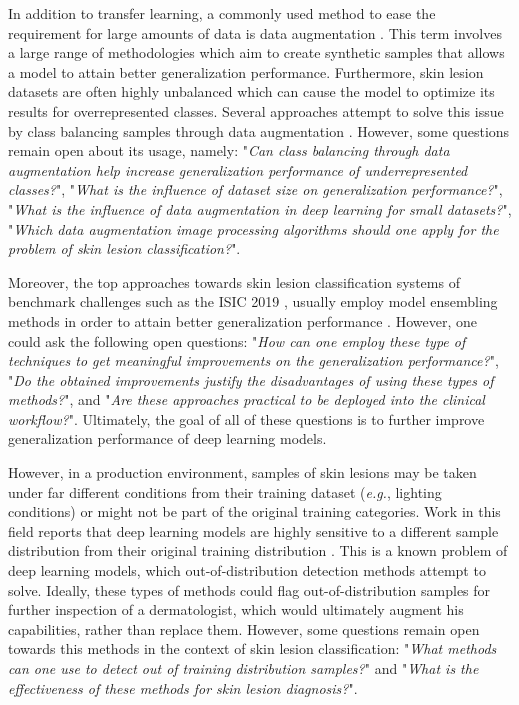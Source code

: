     In addition to transfer learning, a commonly used method to ease the requirement for large amounts of data is data augmentation \cite{Perez2018}. This term involves a large range of methodologies which aim to create synthetic samples that allows a model to attain better generalization performance. Furthermore, skin lesion datasets are often highly unbalanced which can cause the model to optimize its results for overrepresented classes. Several approaches attempt to solve this issue by class balancing samples through data augmentation \cite{He2009}. However, some questions remain open about its usage, namely: "\textit{Can class balancing through data augmentation help increase generalization performance of underrepresented classes?}", "\textit{What is the influence of dataset size on generalization performance?}", "\textit{What is the influence of data augmentation in deep learning for small datasets?}", "\textit{Which data augmentation image processing algorithms should one apply for the problem of skin lesion classification?}". \par
    
    Moreover, the top approaches towards skin lesion classification systems of benchmark challenges such as the \ac{ISIC} 2019 \cite{isic2019}, usually employ model ensembling methods in order to attain better generalization performance \cite{isic2019first} \cite{isic2019second} \cite{isic2019third}. However, one could ask the following open questions: "\textit{How can one employ these type of techniques to get meaningful improvements on the generalization performance?}", "\textit{Do the obtained improvements justify the disadvantages of using these types of methods?}", and "\textit{Are these approaches practical to be deployed into the clinical workflow?}". Ultimately, the goal of all of these questions is to further improve generalization performance of deep learning models. \par
    
    However, in a production environment, samples of skin lesions may be taken under far different conditions from their training dataset (\textit{e.g.}, lighting conditions) or might not be part of the original training categories. Work in this field reports that deep learning models are highly sensitive to a different sample distribution from their original training distribution \cite{humanvsisic2018}\cite{Han2018}. This is a known problem of deep learning models, which out-of-distribution detection methods attempt to solve. Ideally, these types of methods could flag out-of-distribution samples for further inspection of a dermatologist, which would ultimately augment his capabilities, rather than replace them. However, some questions remain open towards this methods in the context of skin lesion classification: "\textit{What methods can one use to detect out of training distribution samples?}" and "\textit{What is the effectiveness of these methods for skin lesion diagnosis?}".


